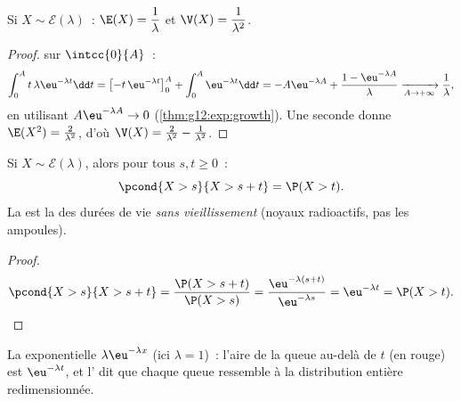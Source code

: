 \begin{proposition}\label{prop:g12:contdist:expomoments}
Si $X \sim \mathcal E(\lambda)$~:
$\E(X) = \dfrac{1}{\lambda}$ et $\V(X) = \dfrac{1}{\lambda^2}$.
\end{proposition}

\begin{proof}
 sur $\intcc{0}{A}$~:
\[
\int_0^A t\,\lambda\eu^{-\lambda t}\dd t
= \bigl[-t\,\eu^{-\lambda t}\bigr]_0^A + \int_0^A \eu^{-\lambda t}\dd t
= -A\eu^{-\lambda A} + \frac{1 - \eu^{-\lambda A}}{\lambda}
\xrightarrow[A\to+\infty]{} \frac1\lambda,
\]
en utilisant $A\eu^{-\lambda A} \to 0$ (\cref{thm:g12:exp:growth}). Une
seconde  donne $\E(X^2) = \frac{2}{\lambda^2}$, d'où
$\V(X) = \frac{2}{\lambda^2} - \frac{1}{\lambda^2}$.
\end{proof}

\begin{theorem}\label{thm:g12:contdist:memoryless}
Si $X \sim \mathcal E(\lambda)$, alors pour tous $s, t \geq 0$~:
\[
\pcond{X > s}{X > s + t} = \P(X > t) .
\]
La  est la  des durées de vie \emph{sans vieillissement}
(noyaux radioactifs, pas les ampoules).
\end{theorem}

\begin{proof}
\[
\pcond{X > s}{X > s+t}
= \frac{\P(X > s + t)}{\P(X > s)}
= \frac{\eu^{-\lambda(s+t)}}{\eu^{-\lambda s}} = \eu^{-\lambda t}
= \P(X > t). \qedhere
\]
\end{proof}

\begin{omfigure}

{\small La  exponentielle $\lambda\eu^{-\lambda x}$ (ici
$\lambda = 1$)~: l'aire de la queue au-delà de $t$ (en rouge) est
$\eu^{-\lambda t}$, et l' dit que chaque queue ressemble
à la distribution entière redimensionnée.}
\end{omfigure}


